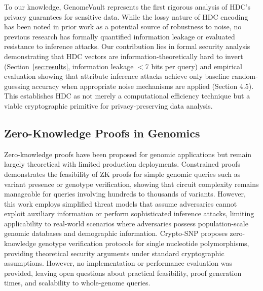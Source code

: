 \documentclass[11pt,letterpaper]{article}
\begin{document}
To our knowledge, GenomeVault represents the first rigorous analysis of HDC's privacy guarantees for sensitive data. While the lossy nature of HDC encoding has been noted in prior work as a potential source of robustness to noise, no previous research has formally quantified information leakage or evaluated resistance to inference attacks. Our contribution lies in formal security analysis demonstrating that HDC vectors are information-theoretically hard to invert (Section~\ref{sec:results}, information leakage $<$7 bits per query) and empirical evaluation showing that attribute inference attacks achieve only baseline random-guessing accuracy when appropriate noise mechanisms are applied (Section 4.5). This establishes HDC as not merely a computational efficiency technique but a viable cryptographic primitive for privacy-preserving data analysis.

\subsection{Zero-Knowledge Proofs in Genomics}

Zero-knowledge proofs have been proposed for genomic applications but remain largely theoretical with limited production deployments. Constrained proofs \cite{bogatyy2020} demonstrates the feasibility of ZK proofs for simple genomic queries such as variant presence or genotype verification, showing that circuit complexity remains manageable for queries involving hundreds to thousands of variants. However, this work employs simplified threat models that assume adversaries cannot exploit auxiliary information or perform sophisticated inference attacks, limiting applicability to real-world scenarios where adversaries possess population-scale genomic databases and demographic information. Crypto-SNP \cite{demmler2019} proposes zero-knowledge genotype verification protocols for single nucleotide polymorphisms, providing theoretical security arguments under standard cryptographic assumptions. However, no implementation or performance evaluation was provided, leaving open questions about practical feasibility, proof generation times, and scalability to whole-genome queries.
\end{document}
